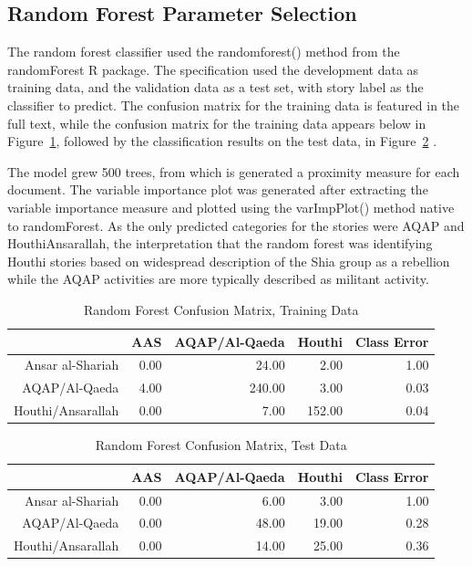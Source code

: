 \subsection{Random Forest Parameter Selection}

The random forest classifier used the randomforest() method from the
randomForest R package. The specification used the development data as training data, and the validation data as a test set, with story label as the classifier to predict. The confusion matrix for the training data is featured in the full text, while the confusion matrix for the training data appears below in Figure~\ref{tab:ref-conf-train}, followed by the classification results on the test data, in Figure~\ref{tab:ref-conf-test} .

The model grew 500 trees, from which is generated a proximity measure for each document. The variable importance plot was generated after extracting the variable importance measure and plotted using the varImpPlot() method native to randomForest. As the only predicted categories for the stories were AQAP and Houthi\/Ansarallah, the interpretation that
the random forest was identifying Houthi stories based on widespread description of the Shia group as a rebellion while the AQAP activities are more typically described as militant activity.

\begin{table}[ht]
 \centering
 \begin{tabular}{rrrrr}
   \hline
  & AAS & AQAP/Al-Qaeda & Houthi & Class Error \\
   \hline
 Ansar al-Shariah & 0.00 & 24.00 & 2.00 & 1.00 \\
   AQAP/Al-Qaeda & 4.00 & 240.00 & 3.00 & 0.03 \\
   Houthi/Ansarallah & 0.00 & 7.00 & 152.00 & 0.04 \\
    \hline
 \end{tabular}
 \caption{Random Forest Confusion Matrix, Training Data}
\label{tab:ref-conf-train}
 \end{table}
 
 
 \begin{table}[ht]
 \centering
 \begin{tabular}{rrrrr}
   \hline
  & AAS & AQAP/Al-Qaeda & Houthi & Class Error \\
   \hline
 Ansar al-Shariah & 0.00 & 6.00 & 3.00 & 1.00 \\
   AQAP/Al-Qaeda & 0.00 & 48.00 & 19.00 & 0.28 \\
   Houthi/Ansarallah & 0.00 & 14.00 & 25.00 & 0.36 \\
    \hline
 \end{tabular}
\caption{Random Forest Confusion Matrix, Test Data}
\label{tab:ref-conf-test}
 \end{table}
  
